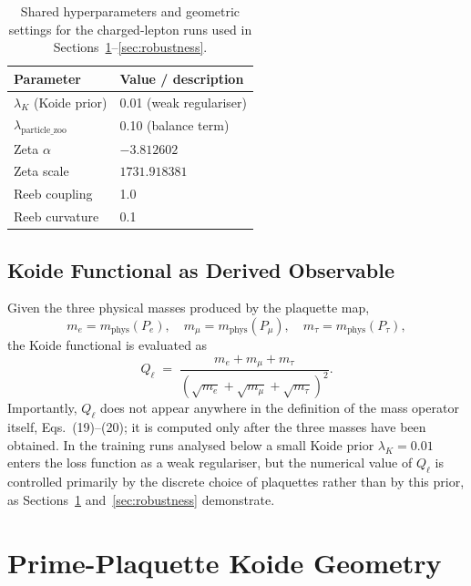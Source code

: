 \documentclass[12pt]{article}
\begin{document}
\begin{table}[ht]
\centering
\begin{tabular}{ll}
\toprule
Parameter & Value / description \\
\midrule
$\lambda_K$ (Koide prior) & 0.01 (weak regulariser) \\
$\lambda_{\mathrm{particle\_zoo}}$ & 0.10 (balance term) \\
Zeta $\alpha$ & $-3.812602$ \\
Zeta scale & $1731.918381$ \\
Reeb coupling & 1.0 \\
Reeb curvature & 0.1 \\
\bottomrule
\end{tabular}
\caption{Shared hyperparameters and geometric settings for the charged-lepton runs used in Sections~\ref{sec:geometry}--\ref{sec:robustness}.}
\label{tab:shared-params}
\end{table}

\subsection{Koide Functional as Derived Observable}
\label{subsec:koide-derived}

Given the three physical masses produced by the plaquette map,
\[
  m_e = m_{\mathrm{phys}}(P_e),\quad
  m_\mu = m_{\mathrm{phys}}(P_\mu),\quad
  m_\tau = m_{\mathrm{phys}}(P_\tau),
\]
the Koide functional is evaluated as
\begin{equation}
  Q_\ell
  \;=\;
  \frac{m_e + m_\mu + m_\tau}
       {\left(\sqrt{m_e} + \sqrt{m_\mu} + \sqrt{m_\tau}\right)^2}.
  \label{eq:koide-derived}
\end{equation}
Importantly, $Q_\ell$ does not appear anywhere in the definition of the
mass operator itself, Eqs.~(19)--(20); it is computed only after the three
masses have been obtained.  In the training runs analysed below a small
Koide prior $\lambda_K = 0.01$ enters the loss function as a weak
regulariser, but the numerical value of $Q_\ell$ is controlled primarily
by the discrete choice of plaquettes rather than by this prior, as
Sections~\ref{sec:geometry} and~\ref{sec:robustness}
demonstrate.

\section{Prime-Plaquette Koide Geometry}
\label{sec:geometry}
\end{document}
